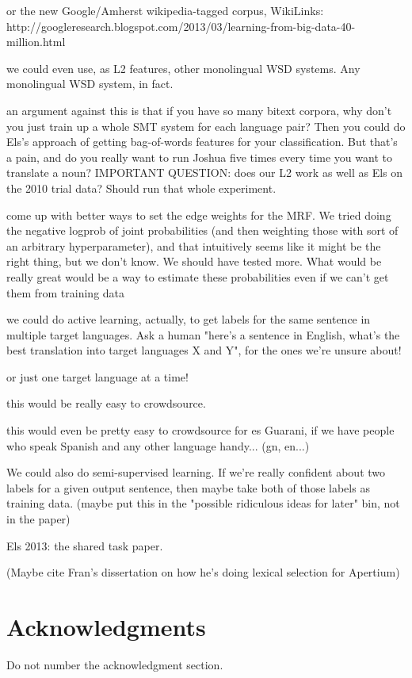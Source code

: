 \documentclass[11pt,letterpaper]{article}
\begin{document}
or the new Google/Amherst wikipedia-tagged corpus, WikiLinks:
http://googleresearch.blogspot.com/2013/03/learning-from-big-data-40-million.html


we could even use, as L2 features, other monolingual WSD systems. Any
monolingual WSD system, in fact.


an argument against this is that if you have so many bitext corpora, why
don't you just train up a whole SMT system for each language pair? Then you
could do Els's approach of getting bag-of-words features for your
classification. But that's a pain, and do you really want to run Joshua five
times every time you want to translate a noun? IMPORTANT QUESTION: does our L2
work as well as Els on the 2010 trial data? Should run that whole experiment.


come up with better ways to set the edge weights for the MRF. We tried doing
the negative logprob of joint probabilities (and then weighting those with
sort of an arbitrary hyperparameter), and that intuitively seems like it might
be the right thing, but we don't know. We should have tested more. What would
be really great would be a way to estimate these probabilities even if we
can't get them from training data

we could do active learning, actually, to get labels for the same sentence
in multiple target languages. Ask a human "here's a sentence in English, what's
the best translation into target languages X and Y", for the ones we're unsure
about!

or just one target language at a time!

this would be really easy to crowdsource.

this would even be pretty easy to crowdsource for es Guarani, if we have
people who speak Spanish and any other language handy... (gn, en...)

We could also do semi-supervised learning. If we're really confident about
two labels for a given output sentence, then maybe take both of those labels as
training data. (maybe put this in the "possible ridiculous ideas for later"
bin, not in the paper)


Els 2013: the shared task paper.

(Maybe cite Fran's dissertation on how he's doing lexical selection for
Apertium)

\cite{task10}

\section*{Acknowledgments}

Do not number the acknowledgment section.


{}
\end{document}
